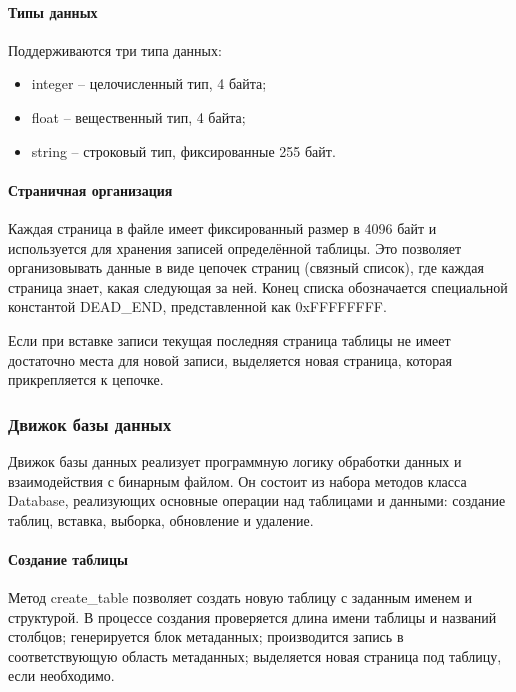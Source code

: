 \paragraph{Типы данных}

Поддерживаются три типа данных:
\begin{itemize}
	\item integer -- целочисленный тип, 4 байта;
	\item float -- вещественный тип, 4 байта;
	\item string -- строковый тип, фиксированные 255 байт.
\end{itemize}

\paragraph{Страничная организация}

Каждая страница в файле имеет фиксированный размер в 4096 байт и используется для хранения записей определённой таблицы. Это позволяет организовывать данные в виде цепочек страниц (связный список), где каждая страница знает, какая следующая за ней. Конец списка обозначается специальной константой DEAD\_END, представленной как 0xFFFFFFFF.

Если при вставке записи текущая последняя страница таблицы не имеет достаточно места для новой записи, выделяется новая страница, которая прикрепляется к цепочке.

\subsubsection{Движок базы данных}

Движок базы данных реализует программную логику обработки данных и взаимодействия с бинарным файлом. Он состоит из набора методов класса Database, реализующих основные операции над таблицами и данными: создание таблиц, вставка, выборка, обновление и удаление.

\paragraph{Создание таблицы}

Метод create\_table позволяет создать новую таблицу с заданным именем и структурой. В процессе создания проверяется длина имени таблицы и названий столбцов; генерируется блок метаданных; производится запись в соответствующую область метаданных; выделяется новая страница под таблицу, если необходимо.

